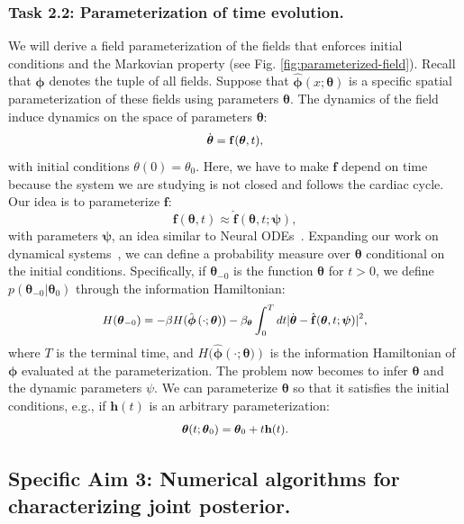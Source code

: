 \subsubsection*{Task 2.2: Parameterization of time evolution.}
We will derive a field parameterization of the fields that enforces initial conditions and the Markovian property (see Fig. \ref{fig:parameterized-field}).
Recall that $\boldsymbol{\phi}$ denotes the tuple of all fields.
Suppose that $\hat{\boldsymbol{\phi}}(x;\boldsymbol{\theta})$ is a specific spatial parameterization of these fields using parameters $\boldsymbol{\theta}$.
The dynamics of the field induce dynamics on the space of parameters $\boldsymbol{\theta}$:
$$
\small
\dot{\boldsymbol{\theta}} = \mathbf{f}(\boldsymbol{\theta},t),
$$
with initial conditions $\theta(0) = \theta_0$.
Here, we have to make $\mathbf{f}$ depend on time because the system we are studying is not closed and follows the cardiac cycle.
Our idea is to parameterize $\mathbf{f}$:
$$
\mathbf{f}(\boldsymbol{\theta},t) \approx \hat{\mathbf{f}}(\boldsymbol{\theta},t;\boldsymbol{\psi}),
$$
with parameters $\boldsymbol{\psi}$, an idea similar to Neural ODEs~\cite{chen2018neural}.
Expanding our work on dynamical systems~\cite{hao2023information}, we can define a probability measure over $\boldsymbol{\theta}$ conditional on the initial conditions.
Specifically, if $\boldsymbol{\theta}_{-0}$ is the function $\boldsymbol{\theta}$ for $t>0$, we define $p(\boldsymbol{\theta}_{-0}|\boldsymbol{\theta}_0)$ through the information Hamiltonian:
$$
\small
H(\boldsymbol{\theta}_{-0}) = -\beta H(\hat{\boldsymbol{\phi}}\left(\cdot;\boldsymbol{\theta})\right) -\beta_{\boldsymbol{\theta}}\int_0^T dt |\dot{\boldsymbol{\theta}}-\hat{\mathbf{f}}(\boldsymbol{\theta},t;\boldsymbol{\psi})|^2,
$$
where $T$ is the terminal time, and $H(\hat{\boldsymbol{\phi}}\left(\cdot;\boldsymbol{\theta})\right)$ is the information Hamiltonian of $\boldsymbol{\phi}$ evaluated at the parameterization.
The problem now becomes to infer $\boldsymbol{\theta}$ and the dynamic parameters $\psi$.
We can parameterize $\boldsymbol{\theta}$ so that it satisfies the initial conditions, e.g., if $\mathbf{h}(t)$ is an arbitrary parameterization:
$$
\small
\boldsymbol{\theta}(t;\boldsymbol{\theta}_0) = \boldsymbol{\theta}_0 + t \mathbf{h}(t).
$$

\subsection*{Specific Aim 3: Numerical algorithms for characterizing joint posterior.}
